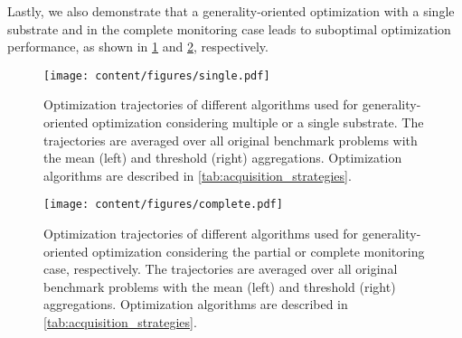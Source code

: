 Lastly, we also demonstrate that a generality-oriented optimization with a single substrate and in the complete monitoring case leads to suboptimal optimization performance, as shown in \cref{fig:results_benchmark_orig_single} and \cref{fig:results_benchmark_orig_complete}, respectively.

\begin{figure}[t]
    \centering
    \texttt{[image: content/figures/single.pdf]}
    \caption{Optimization trajectories of different algorithms used for generality-oriented optimization considering multiple or a single substrate. The trajectories are averaged over all original benchmark problems with the mean (left) and threshold (right) aggregations. Optimization algorithms are described in \cref{tab:acquisition_strategies}.}
    \label{fig:results_benchmark_orig_single}
\end{figure}
\begin{figure}[t]
    \centering
    \texttt{[image: content/figures/complete.pdf]}
    \caption{Optimization trajectories of different algorithms used for generality-oriented optimization considering the partial or complete monitoring case, respectively. The trajectories are averaged over all original benchmark problems with the mean (left) and threshold (right) aggregations. Optimization algorithms are described in \cref{tab:acquisition_strategies}.}
    \label{fig:results_benchmark_orig_complete}
\end{figure}